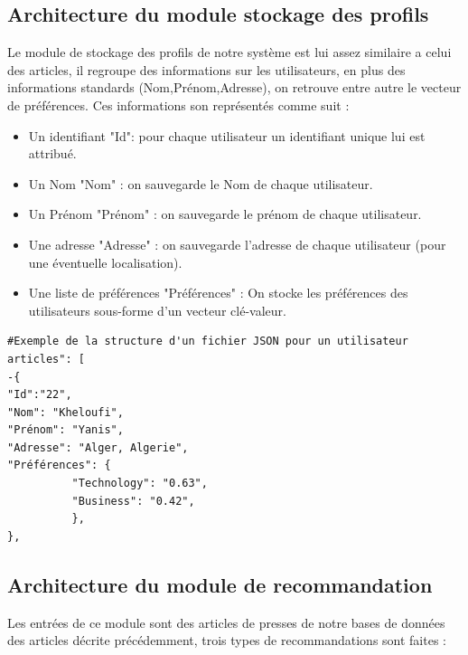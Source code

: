 \subsection{Architecture du module stockage des profils}
Le module de stockage des profils de notre système est lui assez similaire a celui des articles, il regroupe des informations sur les utilisateurs, en plus des informations standards (Nom,Prénom,Adresse), on retrouve entre autre le vecteur de préférences. Ces informations son représentés comme suit :

\begin{itemize}
	
	\item Un identifiant "Id": pour chaque utilisateur un identifiant unique lui est attribué.\\
	
	\item Un Nom "Nom" : on sauvegarde le Nom de chaque utilisateur.\\
	
	\item Un Prénom "Prénom" : on sauvegarde le prénom de chaque utilisateur.\\
	
	\item Une adresse "Adresse" : on sauvegarde l'adresse de chaque utilisateur (pour une éventuelle localisation).\\
	
	\item Une liste de préférences "Préférences" : On stocke les préférences des utilisateurs sous-forme d'un vecteur clé-valeur.\\
	
\end{itemize}

\begin{lstlisting}[style=code]
#Exemple de la structure d'un fichier JSON pour un utilisateur
articles": [
-{
"Id":"22",
"Nom": "Kheloufi",
"Prénom": "Yanis",
"Adresse": "Alger, Algerie",
"Préférences": {
          "Technology": "0.63",
          "Business": "0.42",
          },
},
\end{lstlisting}


\subsection{Architecture du module de recommandation}
Les entrées de ce module sont des articles de presses de notre bases de données des articles décrite précédemment, trois types de recommandations sont faites :\\

